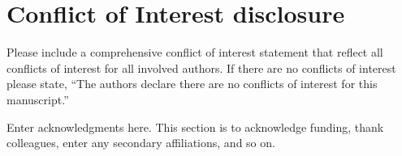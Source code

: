 \documentclass[draft]{agujournal2019}
\begin{document}
\section*{Conflict of Interest disclosure}
Please include a comprehensive conflict of interest statement that reflect all conflicts of interest for all involved authors. If there are no conflicts of interest please state, “The authors declare there are no conflicts of interest for this manuscript.”


\acknowledgments
Enter acknowledgments here. This section is to acknowledge funding, thank colleagues, enter any secondary affiliations, and so on.




%
%

%



%
%
%
%
%
\end{document}
